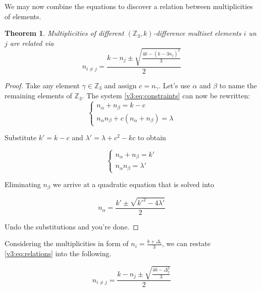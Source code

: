\documentclass{article}
\theoremstyle{plain}
\newtheorem{theorem}{Theorem}[section]
\theoremstyle{definition}
\theoremstyle{remark}
\begin{document}
		We may now combine the equations to discover a relation between multiplicities of elements.
		
		\begin{theorem}
			\label{v3:theorem:relations}
			Multiplicities of different $(\mathbb Z_3,k)$-difference multiset elements $i$ un $j$ are related via
			\begin{equation}
				\label{v3:eq:relations}
				n_{i\neq j} = \frac{k-n_j \pm \sqrt{\frac{4k-(k-3n_j)^2}{3}}}{2}
			\end{equation}
		\end{theorem}
		
		\begin{proof}
			Take any element $\gamma \in \mathbb Z_3$ and assign $c = n_\gamma$. Let's use $\alpha$ and $\beta$ to name the remaining elements of $\mathbb Z_3$. The system \eqref{v3:eq:constraints} can now be rewritten:
			\begin{equation}
				\begin{cases}
					n_\alpha + n_\beta = k - c \\
					n_\alpha n_\beta + c (n_\alpha + n_\beta)  = \lambda 
				\end{cases}
			\end{equation}
			
			Substitute $k'=k-c$ and $\lambda' = \lambda + c^2-kc$ to obtain
			
			\begin{equation}
				\begin{cases}
					n_\alpha + n_\beta = k' \\
					n_\alpha n_\beta = \lambda'
				\end{cases}
			\end{equation}
			
			Eliminating $n_\beta$ we arrive at a quadratic equation that is solved into
			
			\begin{equation}
				n_\alpha = \frac{k' \pm \sqrt{k'^2-4\lambda'}}{2}
			\end{equation}
			
			Undo the substitutions and you're done.
		\end{proof}
		
		Considering the multiplicities in form of $n_i = \frac{k+\Delta_i}{3}$, we can restate \eqref{v3:eq:relations} into the following.
	
		\begin{equation}
			\label{v3:eq:relations_delta}
			n_{i\neq j} = \frac{k-n_j \pm \sqrt{\frac{4k-\Delta_j^2}{3}}}{2}
		\end{equation}
		
\end{document}
